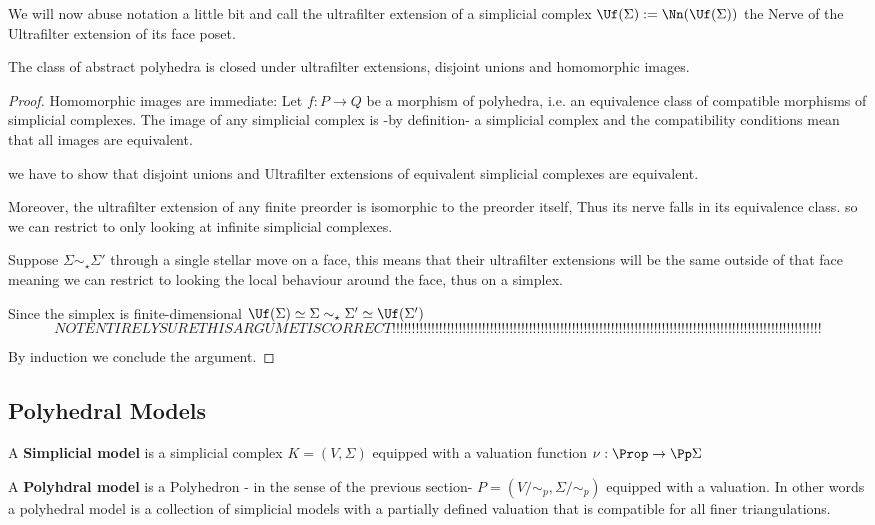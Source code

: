 We will now abuse notation a little bit and call the ultrafilter extension of a simplicial complex $\Uf(\Sigma):=\Nn(\Uf(\Sigma))$ the Nerve of the 
Ultrafilter extension of its face poset.

\begin{proposition}\hfill 

    The class of abstract polyhedra is closed under ultrafilter extensions, disjoint unions and homomorphic images.    
    \end{proposition}
    \begin{proof}\hfill 

        Homomorphic images are immediate:
        Let $f:P\to Q$ be a morphism of polyhedra, i.e. an equivalence class of compatible morphisms of simplicial complexes.
        The image of any simplicial complex is -by definition- a simplicial complex and the compatibility conditions mean that all images are equivalent.

        we have to show that disjoint unions and Ultrafilter extensions of equivalent simplicial complexes are equivalent.
    
        Moreover, the ultrafilter extension of any finite preorder is isomorphic to the preorder itself, Thus its nerve falls in its equivalence class.
        so we can restrict to only looking at infinite simplicial complexes.

        Suppose $\Sigma\sim_\star\Sigma'$ through a single stellar move on a face, this means that their ultrafilter extensions will be the same outside of that face
        meaning we can restrict to looking the local behaviour around the face, thus on a simplex.

        Since the simplex is finite-dimensional $\Uf(\Sigma)\simeq \Sigma\sim_\star\Sigma'\simeq\Uf(\Sigma')$
        \[NOTENTIRELYSURETHISARGUMETISCORRECT!!!!!!!!!!!!!!!!!!!!!!!!!!!!!!!!!!!!!!!!!!!!!!!!!!!!!!!!!!!!!!!!!!!!!!!!!!!!!!!!!!!!!!!!!!!!!!!!!!!!!!!!!!!!!!\]

        By induction we conclude the argument.
    \end{proof}

\subsection{Polyhedral Models}
\begin{definition}\hfill 

    A \textbf{Simplicial model} is a simplicial complex $K=(V,\Sigma)$ equipped with a valuation function
    $\nu:\Prop\to\Pp\Sigma$

    A \textbf{Polyhdral model} is a Polyhedron - in the sense of the previous section- $P=(V/\sim_p,\Sigma/\sim_p)$ equipped with a valuation.
    In other words a polyhedral model is a collection of simplicial models with a partially defined valuation that is compatible for all finer triangulations.
\end{definition}

